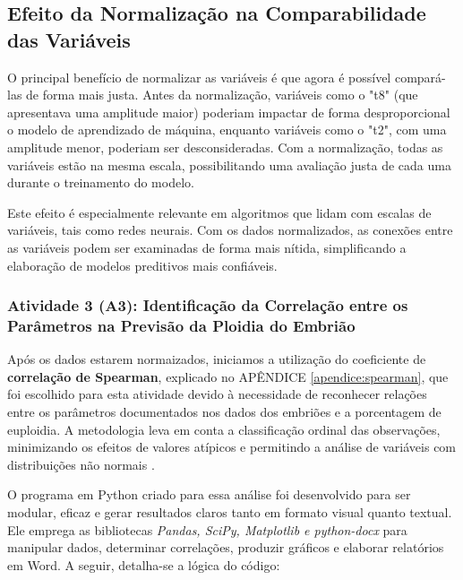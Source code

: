 \subsection*{Efeito da Normalização na Comparabilidade das Variáveis}
O principal benefício de normalizar as variáveis é que agora é possível compará-las de forma mais justa. Antes da normalização, variáveis como o "t8" (que apresentava uma amplitude maior) poderiam impactar de forma desproporcional o modelo de aprendizado de máquina, enquanto variáveis como o "t2", com uma amplitude menor, poderiam ser desconsideradas. Com a normalização, todas as variáveis estão na mesma escala, possibilitando uma avaliação justa de cada uma durante o treinamento do modelo.

Este efeito é especialmente relevante em algoritmos que lidam com escalas de variáveis, tais como redes neurais. Com os dados normalizados, as conexões entre as variáveis podem ser examinadas de forma mais nítida, simplificando a elaboração de modelos preditivos mais confiáveis.

\subsubsection{Atividade 3 (A3): Identificação da Correlação entre os Parâmetros na Previsão da Ploidia do Embrião}

Após os dados estarem normaizados, iniciamos a utilização do coeficiente de \textbf{correlação de Spearman}, explicado no APÊNDICE \ref{apendice:spearman}, que foi escolhido para esta atividade devido à necessidade de reconhecer relações entre os parâmetros documentados nos dados dos embriões e a porcentagem de euploidia. A metodologia leva em conta a classificação ordinal das observações, minimizando os efeitos de valores atípicos e permitindo a análise de variáveis com distribuições não normais \cite{sousa2019}.

O programa em Python criado para essa análise foi desenvolvido para ser modular, eficaz e gerar resultados claros tanto em formato visual quanto textual. Ele emprega as bibliotecas \textit{Pandas, SciPy, Matplotlib e python-docx} para manipular dados, determinar correlações, produzir gráficos e elaborar relatórios em Word. A seguir, detalha-se a lógica do código:

